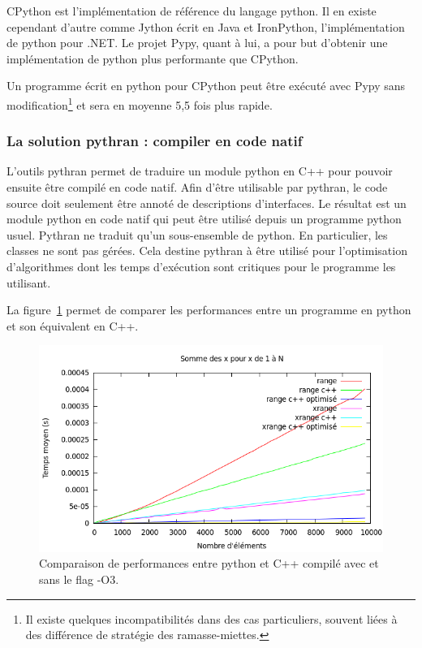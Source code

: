 \documentclass[a4paper]{article}
\begin{document}
CPython est l'implémentation de référence du langage python. Il en existe cependant d'autre comme Jython écrit en Java et IronPython, l'implémentation de python pour .NET. Le projet Pypy, quant à lui, a pour but d'obtenir une implémentation de python plus performante que CPython.

Un programme écrit en python pour CPython peut être exécuté avec Pypy sans modification\footnote{Il existe quelques incompatibilités dans des cas particuliers, souvent liées à des différence de stratégie des ramasse-miettes\cite{PypyDiff}.} et sera en moyenne 5,5 fois plus rapide\cite{PypySpeed}.

\subsubsection{La solution pythran : compiler en code natif}

L'outils pythran permet de traduire un module python en C++ pour pouvoir ensuite être compilé en code natif. Afin d'être utilisable par pythran, le code source doit seulement être annoté de descriptions d'interfaces. Le résultat est un module python en code natif qui peut être utilisé depuis un programme python usuel. Pythran ne traduit qu'un sous-ensemble de python. En particulier, les classes ne sont pas gérées. Cela destine pythran à être utilisé pour l'optimisation d'algorithmes dont les temps d'exécution sont critiques pour le programme les utilisant.

La figure~\ref{RangeXrangePyCpp} permet de comparer les performances entre un programme en python et son équivalent en C++.

\begin{figure}[h]
  \includegraphics[scale=0.5]{./Pictures/RangeXrangePyCpp}
  \caption{Comparaison de performances entre python et C++ compilé avec et sans le flag -O3.}
  \label{RangeXrangePyCpp}
\end{figure}
\end{document}

